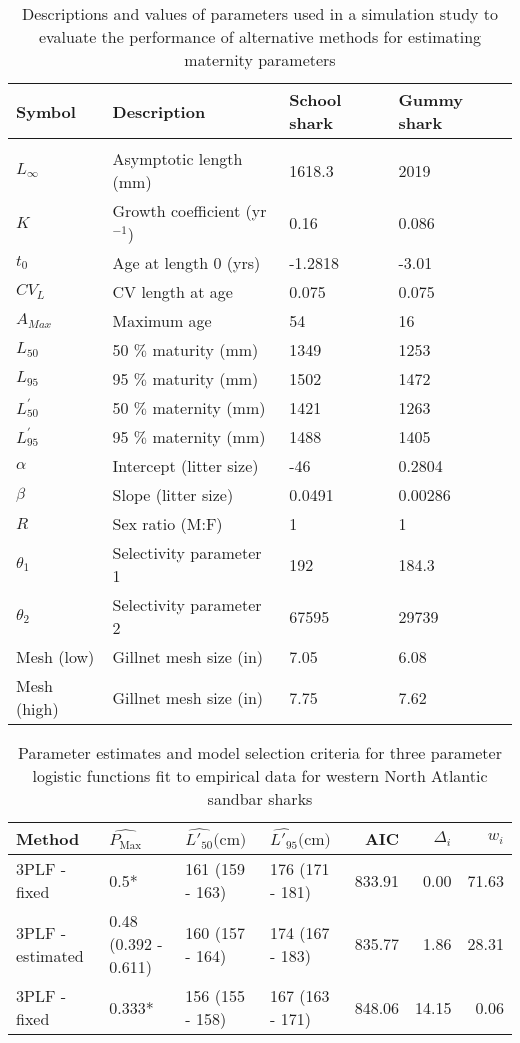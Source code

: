\documentclass[
]{article}
\author{}
\date{\vspace{-2.5em}}
\begin{document}
\hfill\break
\hfill\break

\begin{table}[ht]
\centering
\caption{Descriptions and values of parameters used in a simulation study to evaluate the performance of alternative methods for estimating maternity parameters \newline} 
\begin{tabular}{llll}
  \toprule
Symbol & Description & School shark & Gummy shark \\ 
  \midrule
 &  &  &  \\ 
  $L_{\infty}$ & Asymptotic length (mm) & 1618.3 & 2019 \\ 
  $K$ & Growth coefficient (yr$^{-1}$) & 0.16 & 0.086 \\ 
  $t_0$ & Age at length 0 (yrs) & -1.2818 & -3.01 \\ 
  $CV_L$ & CV length at age & 0.075 & 0.075 \\ 
  $A_{Max}$ & Maximum age & 54 & 16 \\ 
  $L_{50}$ & 50 $\%$ maturity (mm) & 1349 & 1253 \\ 
  $L_{95}$ & 95 $\%$ maturity (mm) & 1502 & 1472 \\ 
  $L^{\prime}_{50}$ & 50 $\%$ maternity (mm) & 1421 & 1263 \\ 
  $L^{\prime}_{95}$ & 95 $\%$ maternity (mm) & 1488 & 1405 \\ 
  $\alpha$ & Intercept (litter size) & -46 & 0.2804 \\ 
  $\beta$ & Slope (litter size) & 0.0491 & 0.00286 \\ 
  $R$ & Sex ratio (M:F) & 1 & 1 \\ 
  $\theta_1$ & Selectivity parameter 1 & 192 & 184.3 \\ 
  $\theta_2$ & Selectivity parameter 2 & 67595 & 29739 \\ 
  Mesh (low) & Gillnet mesh size  (in) & 7.05 & 6.08 \\ 
  Mesh (high) & Gillnet mesh size (in) & 7.75 & 7.62 \\ 
   \bottomrule
\end{tabular}
\end{table}

\newpage

\begin{table}[ht]
\centering
\caption{Parameter estimates and model selection criteria for three parameter logistic functions fit to empirical data for western North Atlantic sandbar sharks} 
\begin{tabular}{llllrrr}
  \toprule
Method & $\hat{P_{\text{Max}}}$ & $\hat{L'_{50}}\text{(cm)}$ & $\hat{L'_{95}}\text{(cm)}$ & AIC & $\Delta_{i}$ & $w_i$ \\ 
  \midrule
3PLF - fixed & 0.5* & 161 (159 - 163) & 176 (171 - 181) & 833.91 & 0.00 & 71.63 \\ 
  3PLF - estimated & 0.48 (0.392 - 0.611) & 160 (157 - 164) & 174 (167 - 183) & 835.77 & 1.86 & 28.31 \\ 
  3PLF - fixed & 0.333* & 156 (155 - 158) & 167 (163 - 171) & 848.06 & 14.15 & 0.06 \\ 
   \bottomrule
\end{tabular}
\end{table}
\end{document}
